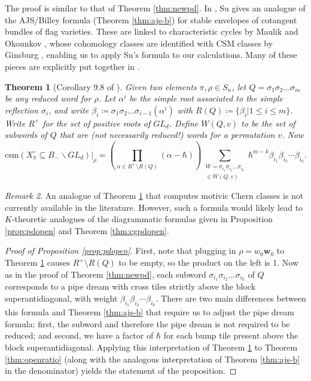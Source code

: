 \documentclass[reqno]{amsart}
\newcommand{\csm}{\textrm{csm}}
\numberwithin{equation}{section}
\newtheorem{theorem}{Theorem}[section]
\theoremstyle{definition}
\theoremstyle{remark}
\newtheorem{remark}[theorem]{Remark}
\begin{document}
The proof is similar to that of Theorem \ref{thm:newpd}. In \cite{csu}, Su gives an analogue of the AJS/Billey formula (Theorem \ref{thm:ajs-b}) for stable envelopes of cotangent bundles of flag varieties. These are linked to characteristic cycles by Maulik and Okounkov \cite{MO}, whose cohomology classes are identified with CSM classes by Ginsburg \cite{g86}, enabling us to apply Su's formula to our calculations.
Many of these pieces are explicitly put together in \cite[Section 9]{AMSS23}.
\begin{theorem}[Corollary 9.8 of \cite{AMSS23}]\label{thm:su}
Given two elements $\pi,\rho \in S_n$, let $Q=\sigma_1\sigma_2\dots \sigma_m$ be any reduced word for $\rho$. Let $\alpha^i$ be the simple root associated to the simple reflection $\sigma_i$, and write $\beta_i \coloneqq \sigma_1\sigma_2\dots \sigma_{i-1}(\alpha^i)$ with $R(Q)\coloneqq\{\beta_i|1 \leq i \leq m\}$. Write $R^+$ for the set of positive roots of $GL_d$.
Define $W(Q,v)$ to be the set of subwords of $Q$ that are (not necessarily reduced!) words for a permutation $v$. Now
\[\csm(X_\pi^\circ \subseteq B_- \backslash GL_d)\Big|_{\rho}=\left(\prod_{\alpha \in R^+ \setminus R(Q)} (\alpha-\hbar)\right)
\sum_{\substack{W=\sigma_{i_1}\sigma_{i_2}\dots \sigma_{i_k}\\ \in W(Q,v)}} \hbar^{m-k}\beta_{i_1}\beta_{i_2}\cdots\beta_{i_k}.\]
\end{theorem}
\begin{remark}
An analogue of Theorem \ref{thm:su} that computes motivic Chern classes is not currently available in the literature. However, such a formula would likely lead to $K$-theoretic analogues of the diagrammatic formulas given in Proposition \ref{prop:pdopen} and Theorem \ref{thm:cgpdopen}.
\end{remark}
\begin{proof}[Proof of Proposition \ref{prop:pdopen}]
First, note that plugging in $\rho=w_0\mathbf{w}_0$ to Theorem \ref{thm:su} causes $R^+ \setminus R(Q)$ to be empty, so the product on the left is 1. Now as in the proof of Theorem \ref{thm:newpd}, each subword $\sigma_{i_1}\sigma_{i_2}\dots \sigma_{i_k}$ of $Q$ corresponds to a pipe dream with cross tiles strictly above the block superantidiagonal, with weight $\beta_{i_1}\beta_{i_2}\cdots\beta_{i_k}$. 
There are two main differences between this formula and Theorem \ref{thm:ajs-b} that require us to adjust the pipe dream formula: first, the subword and therefore the pipe dream is not required to be reduced; and second, we have a factor of $\hbar$ for each bump tile present above the block superantidiagonal. 
Applying this interpretation of Theorem \ref{thm:su} to Theorem \ref{thm:openratio}  (along with the analogous interpretation of Theorem \ref{thm:ajs-b} in the denominator) yields the statement of the proposition.
\end{proof}
\end{document}
